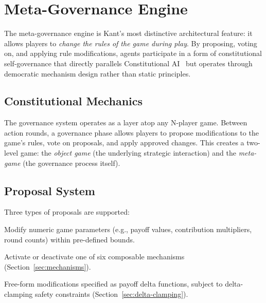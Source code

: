 
\section{Meta-Governance Engine}
\label{sec:governance}

The meta-governance engine is Kant's most distinctive architectural feature:
it allows players to \emph{change the rules of the game during play}. By
proposing, voting on, and applying rule modifications, agents participate in
a form of constitutional self-governance that directly parallels Constitutional
AI~\citep{bai2022constitutional} but operates through democratic mechanism
design rather than static principles.


\subsection{Constitutional Mechanics}
\label{sec:constitutional}

The governance system operates as a layer atop any N-player game. Between
action rounds, a governance phase allows players to propose modifications to
the game's rules, vote on proposals, and apply approved changes. This creates
a two-level game: the \emph{object game} (the underlying strategic interaction)
and the \emph{meta-game} (the governance process itself).


\subsection{Proposal System}
\label{sec:proposals}

Three types of proposals are supported:

\begin{description}[nosep]
    \item[Parameter Proposals.] Modify numeric game parameters (e.g., payoff
        values, contribution multipliers, round counts) within pre-defined
        bounds.
    \item[Mechanic Proposals.] Activate or deactivate one of six composable
        mechanisms (Section~\ref{sec:mechanisms}).
    \item[Custom Proposals.] Free-form modifications specified as payoff
        delta functions, subject to delta-clamping safety constraints
        (Section~\ref{sec:delta-clamping}).
\end{description}

